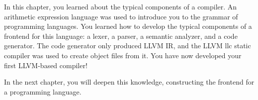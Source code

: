 In this chapter, you learned about the typical components of a compiler. An arithmetic expression language was used to introduce you to the grammar of programming languages. You learned how to develop the typical components of a frontend for this language: a lexer, a parser, a semantic analyzer, and a code generator. The code generator only produced LLVM IR, and the LLVM llc static compiler was used to create object files from it. You have now developed your first LLVM-based compiler!

In the next chapter, you will deepen this knowledge, constructing the frontend for a programming language.
